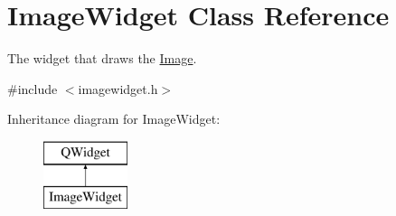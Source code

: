 \hypertarget{class_image_widget}{}\section{Image\+Widget Class Reference}
\label{class_image_widget}


The widget that draws the \hyperlink{class_image}{Image}.  




{\ttfamily \#include $<$imagewidget.\+h$>$}

Inheritance diagram for Image\+Widget\+:\begin{figure}[H]
\begin{center}
\leavevmode
\includegraphics[height=2.000000cm]{class_image_widget}
\end{center}
\end{figure}
